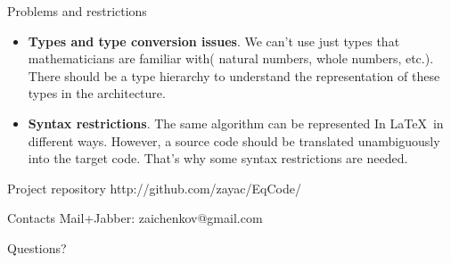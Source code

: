 \documentclass[xcolor=dvipsnames,mathserif,professionalfont,12pt]{beamer}
\begin{document}

\begin{frame}{Problems and restrictions}
  \begin{itemize}
    \item \textbf{Types and type conversion issues}. We can't use just
    types that mathematicians are familiar with( natural numbers, whole
    numbers, etc.). There should be a type hierarchy to understand the
    representation of these types in the architecture.
    \item \textbf{Syntax restrictions}. The same algorithm
    can be represented In \LaTeX\ in different ways. However, a source code
    should be translated unambiguously into the target code. That's why some
    syntax restrictions are needed.
  \end{itemize}
\end{frame}


\begin{frame}
  \begin{block}{Project repository}
    http://github.com/zayac/EqCode/
  \end{block}
  \begin{block}{Contacts}
    Mail+Jabber: zaichenkov@gmail.com
  \end{block}
\begin{center} Questions? \end{center}
\end{frame}
\end{document}
